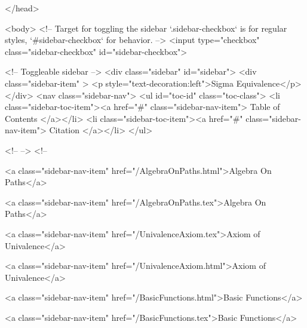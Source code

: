  
</head>




  <body>
    <!-- Target for toggling the sidebar `.sidebar-checkbox` is for regular
     styles, `#sidebar-checkbox` for behavior. -->
<input type="checkbox" class="sidebar-checkbox" id="sidebar-checkbox">

<!-- Toggleable sidebar -->
<div class="sidebar" id="sidebar">
  <div class="sidebar-item" >
    <p style="text-decoration:left">Sigma Equivalence</p>
  </div>
  <nav class="sidebar-nav">
    <ul id="toc-id" class="toc-class">
  <li class="sidebar-toc-item"><a href="#" class="sidebar-nav-item"> Table of Contents </a></li>
  <li class="sidebar-toc-item"><a href="#" class="sidebar-nav-item"> Citation </a></li>
</ul>


    <!--  -->
    <!-- 
      
    
      
    
      
    
      
        
      
    
      
        
          <a class="sidebar-nav-item" href="/AlgebraOnPaths.html">Algebra On Paths</a>
        
      
    
      
        
          <a class="sidebar-nav-item" href="/AlgebraOnPaths.tex">Algebra On Paths</a>
        
      
    
      
        
          <a class="sidebar-nav-item" href="/UnivalenceAxiom.tex">Axiom of Univalence</a>
        
      
    
      
        
          <a class="sidebar-nav-item" href="/UnivalenceAxiom.html">Axiom of Univalence</a>
        
      
    
      
        
          <a class="sidebar-nav-item" href="/BasicFunctions.html">Basic Functions</a>
        
      
    
      
        
          <a class="sidebar-nav-item" href="/BasicFunctions.tex">Basic Functions</a>
        
      
    
      
        

